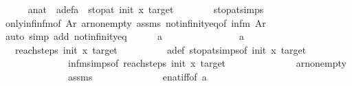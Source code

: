 \begin{isabellebody}
\ \ \ \ \isamarkupfalse%
\ a{\isacharcolon}{\kern0pt}{\isacharcolon}{\kern0pt}nat\ \ a{\isacharunderscore}{\kern0pt}def{\isacharcolon}{\kern0pt}{\isachardoublequoteopen}a\ {\isacharequal}{\kern0pt}\ stop{\isacharunderscore}{\kern0pt}at\ init\ x\ target{\isachardoublequoteclose}\isanewline
\ \ \ \ \ \ \isamarkupfalse%
\ stop{\isacharunderscore}{\kern0pt}at{\isachardot}{\kern0pt}simps\ \isanewline
\ \ \ \ \ \ \isamarkupfalse%
\ only{\isacharunderscore}{\kern0pt}inf{\isacharunderscore}{\kern0pt}infm{\isacharbrackleft}{\kern0pt}of\ Ar{\isacharbrackright}{\kern0pt}\ ar{\isacharunderscore}{\kern0pt}nonempty\ assms{\isacharparenleft}{\kern0pt}{}{\isacharparenright}{\kern0pt}\ not{\isacharunderscore}{\kern0pt}infinity{\isacharunderscore}{\kern0pt}eq{\isacharbrackleft}{\kern0pt}of\ {\isachardoublequoteopen}infm\ Ar{\isachardoublequoteclose}{\isacharbrackright}{\kern0pt}\isanewline
\ \ \ \ \ \ \isamarkupfalse%
\ {\isacharparenleft}{\kern0pt}auto\ simp\ add{\isacharcolon}{\kern0pt}\ not{\isacharunderscore}{\kern0pt}infinity{\isacharunderscore}{\kern0pt}eq{\isacharparenright}{\kern0pt}\isanewline
\ \ \ \ \isamarkupfalse%
\ {\isachardoublequoteopen}a\ {\isasymnoteq}\ {}{\isachardoublequoteclose}\ \isanewline
\ \ \ \ \isamarkupfalse%
\isanewline
\ \ \ \ \ \ \isamarkupfalse%
\ {\isachardoublequoteopen}a\ {\isacharequal}{\kern0pt}\ {}{\isachardoublequoteclose}\isanewline
\ \ \ \ \ \ \isamarkupfalse%
\ \isamarkupfalse%
\ {\isachardoublequoteopen}{}\ {\isasymin}\ reach{\isacharunderscore}{\kern0pt}steps\ init\ x\ target{\isachardoublequoteclose}\isanewline
\ \ \ \ \ \ \ \ \isamarkupfalse%
\ a{\isacharunderscore}{\kern0pt}def\ stop{\isacharunderscore}{\kern0pt}at{\isachardot}{\kern0pt}simps{\isacharbrackleft}{\kern0pt}of\ init\ x\ target{\isacharbrackright}{\kern0pt}\isanewline
\ \ \ \ \ \ \ \ \ \ \ \ \ \ infm{\isachardot}{\kern0pt}simps{\isacharbrackleft}{\kern0pt}of\ {\isachardoublequoteopen}reach{\isacharunderscore}{\kern0pt}steps\ init\ x\ target{\isachardoublequoteclose}{\isacharbrackright}{\kern0pt}\isanewline
\ \ \ \ \ \ \ \ \ \ \ \ \ \ ar{\isacharunderscore}{\kern0pt}nonempty\isanewline
\ \ \ \ \ \ \ \ \ \ \ \ \ \ assms{\isacharparenleft}{\kern0pt}{}{\isacharparenright}{\kern0pt}\isanewline
\ \ \ \ \ \ \ \ \ \ \ \ \ \ enat{\isacharunderscore}{\kern0pt}{}{\isacharunderscore}{\kern0pt}iff{\isacharbrackleft}{\kern0pt}of\ a{\isacharbrackright}{\kern0pt}\isanewline

\end{isabellebody}
